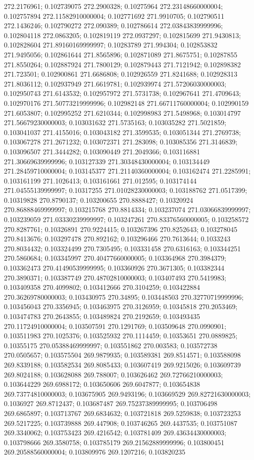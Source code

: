 272.2176961; 0.102739075 272.2900328; 0.10275964 272.23148660000004; 0.102757894 272.11582910000004; 0.102771692 271.9910705; 0.102790511 272.1436246; 0.102790272 272.090389; 0.102786614 272.03843839999996; 0.102804118 272.0863205; 0.102819119 272.0937297; 0.102815699 271.9430813; 0.102828604 271.89160169999997; 0.10283789 271.994304; 0.102853832 271.9495056; 0.102861644 271.8565896; 0.102871089 271.8675751; 0.10287855 271.8550264; 0.102887924 271.7800129; 0.102879443 271.7121942; 0.102898382 271.723501; 0.102900861 271.6686808; 0.102926559 271.8241688; 0.102928313 271.8036112; 0.102937949 271.6619781; 0.102939974 271.57206030000003; 0.102950743 271.6143532; 0.102957972 271.5731738; 0.102967641 271.4709643; 0.102970176 271.50773219999996; 0.102982148 271.66711760000004; 0.102990159 271.6053807; 0.102995252 271.6210344; 0.102998983 271.5498968; 0.103014797 271.56679230000003; 0.103031632 271.5735163; 0.103035282 271.5021859; 0.103041037 271.4155016; 0.103043182 271.3599535; 0.103051344 271.2769738; 0.103067278 271.2671232; 0.103072371 271.283098; 0.103085356 271.3146839; 0.103096507 271.3444282; 0.103090449 271.2049366; 0.103116881 271.30669639999996; 0.103127339 271.30348430000004; 0.103134449 271.28459710000004; 0.103145377 271.21140360000004; 0.103162474 271.2285991; 0.103161199 271.1026413; 0.103161661 271.012595; 0.103174144 271.04555139999997; 0.10317255 271.01028230000003; 0.103188762 271.0517399; 0.10319828 270.8790137; 0.103200655 270.8888427; 0.10320924 270.86888469999997; 0.103215768 270.8814334; 0.103237074 271.03066839999997; 0.103239059 271.03330239999997; 0.103247261 270.83376560000005; 0.103258572 270.8287761; 0.10326891 270.9224415; 0.103267396 270.8252643; 0.103278045 270.8413676; 0.103297478 270.892162; 0.103296466 270.7613644; 0.1033243 270.8034432; 0.103324499 270.7305495; 0.103331458 270.6316163; 0.103344251 270.5860684; 0.103345997 270.40477660000005; 0.103364968 270.3984379; 0.103362473 270.41490539999995; 0.103360926 270.3671305; 0.103382344 270.3890371; 0.103387749 270.48702810000003; 0.103407493 270.5419983; 0.103409358 270.4099802; 0.103412666 270.3104259; 0.103422884 270.36269780000003; 0.103430975 270.34895; 0.103448503 270.32770719999996; 0.103456043 270.3356945; 0.103463975 270.3126959; 0.10345818 270.2053469; 0.103474783 270.2643855; 0.103489824 270.2192659; 0.103493435 270.11724910000004; 0.103507591 270.1291769; 0.103509648 270.0990901; 0.103511983 270.1025376; 0.103525932 270.1114459; 0.10353651 270.0889825; 0.10355175 270.05388469999997; 0.103551862 270.003583; 0.103572738 270.0505657; 0.103575504 269.9879935; 0.103589381 269.8514571; 0.103588098 269.8339188; 0.103582534 269.8085433; 0.103607419 269.9215026; 0.103609739 269.8024188; 0.103628088 269.788007; 0.103626462 269.72766210000003; 0.103644229 269.6988172; 0.103650606 269.6047877; 0.103654838 269.73774810000003; 0.103675905 269.9493196; 0.103669529 269.82721630000003; 0.1036927 269.8712437; 0.103687487 269.75237389999995; 0.103706498 269.6865897; 0.103713767 269.6834632; 0.103721818 269.5259838; 0.103723253 269.5217225; 0.103739888 269.447908; 0.103746265 269.4437535; 0.103751087 269.3340062; 0.103753423 269.4216542; 0.103781409 269.43634430000003; 0.103798666 269.3580758; 0.103785179 269.21562889999996; 0.103800451 269.20588560000004; 0.103809976 269.1207216; 0.103820235 